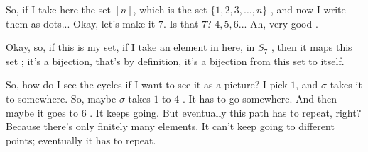 \begin{speech}[00:29:27 - 00:30:52]
So, if I take here the set $[n]$, which is the set $\{1, 2, 3, \dots, n\}$ , and now I write them as dots... Okay, let's make it $7$. Is that $7$? $4, 5, 6$... Ah, very good .

Okay, so, if this is my set, if I take an element in here, in $S_7$ , then it maps this set ; it's a bijection, that's by definition, it's a bijection from this set to itself.

So, how do I see the cycles if I want to see it as a picture? I pick $1$, and $\sigma$ takes it to somewhere. So, maybe $\sigma$ takes $1$ to $4$ . It has to go somewhere. And then maybe it goes to $6$ . It keeps going. But eventually this path has to repeat, right? Because there's only finitely many elements. It can't keep going to different points; eventually it has to repeat.
\end{speech}

